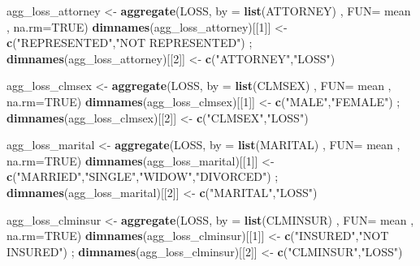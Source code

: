 \documentclass[]{book}
\newenvironment{Shaded}{\begin{snugshade}}{\end{snugshade}}
\newcommand{\DataTypeTok}[1]{\textcolor[rgb]{0.13,0.29,0.53}{#1}}
\newcommand{\DecValTok}[1]{\textcolor[rgb]{0.00,0.00,0.81}{#1}}
\newcommand{\KeywordTok}[1]{\textcolor[rgb]{0.13,0.29,0.53}{\textbf{#1}}}
\newcommand{\NormalTok}[1]{#1}
\newcommand{\OtherTok}[1]{\textcolor[rgb]{0.56,0.35,0.01}{#1}}
\newcommand{\StringTok}[1]{\textcolor[rgb]{0.31,0.60,0.02}{#1}}
\begin{document}
\begin{Shaded}
\begin{Highlighting}[]
\NormalTok{agg_loss_attorney <-}\StringTok{ }\KeywordTok{aggregate}\NormalTok{(LOSS, }\DataTypeTok{by =} \KeywordTok{list}\NormalTok{(ATTORNEY) , }\DataTypeTok{FUN=}\NormalTok{ mean , }\DataTypeTok{na.rm=}\OtherTok{TRUE}\NormalTok{)}
  \KeywordTok{dimnames}\NormalTok{(agg_loss_attorney)[[}\DecValTok{1}\NormalTok{]] <-}\StringTok{ }\KeywordTok{c}\NormalTok{(}\StringTok{"REPRESENTED"}\NormalTok{,}\StringTok{"NOT REPRESENTED"}\NormalTok{) ; }\KeywordTok{dimnames}\NormalTok{(agg_loss_attorney)[[}\DecValTok{2}\NormalTok{]] <-}\StringTok{ }\KeywordTok{c}\NormalTok{(}\StringTok{"ATTORNEY"}\NormalTok{,}\StringTok{"LOSS"}\NormalTok{)}
  
\NormalTok{  agg_loss_clmsex   <-}\StringTok{ }\KeywordTok{aggregate}\NormalTok{(LOSS, }\DataTypeTok{by =} \KeywordTok{list}\NormalTok{(CLMSEX)  , }\DataTypeTok{FUN=}\NormalTok{ mean , }\DataTypeTok{na.rm=}\OtherTok{TRUE}\NormalTok{)}
  \KeywordTok{dimnames}\NormalTok{(agg_loss_clmsex)[[}\DecValTok{1}\NormalTok{]]   <-}\StringTok{ }\KeywordTok{c}\NormalTok{(}\StringTok{"MALE"}\NormalTok{,}\StringTok{"FEMALE"}\NormalTok{)  ; }\KeywordTok{dimnames}\NormalTok{(agg_loss_clmsex)[[}\DecValTok{2}\NormalTok{]] <-}\StringTok{ }\KeywordTok{c}\NormalTok{(}\StringTok{"CLMSEX"}\NormalTok{,}\StringTok{"LOSS"}\NormalTok{)}
  
\NormalTok{  agg_loss_marital  <-}\StringTok{ }\KeywordTok{aggregate}\NormalTok{(LOSS, }\DataTypeTok{by =} \KeywordTok{list}\NormalTok{(MARITAL) , }\DataTypeTok{FUN=}\NormalTok{ mean , }\DataTypeTok{na.rm=}\OtherTok{TRUE}\NormalTok{)}
  \KeywordTok{dimnames}\NormalTok{(agg_loss_marital)[[}\DecValTok{1}\NormalTok{]]  <-}\StringTok{ }\KeywordTok{c}\NormalTok{(}\StringTok{"MARRIED"}\NormalTok{,}\StringTok{"SINGLE"}\NormalTok{,}\StringTok{"WIDOW"}\NormalTok{,}\StringTok{"DIVORCED"}\NormalTok{) ; }\KeywordTok{dimnames}\NormalTok{(agg_loss_marital)[[}\DecValTok{2}\NormalTok{]] <-}\StringTok{ }\KeywordTok{c}\NormalTok{(}\StringTok{"MARITAL"}\NormalTok{,}\StringTok{"LOSS"}\NormalTok{)}
  
\NormalTok{  agg_loss_clminsur <-}\StringTok{ }\KeywordTok{aggregate}\NormalTok{(LOSS, }\DataTypeTok{by =} \KeywordTok{list}\NormalTok{(CLMINSUR) , }\DataTypeTok{FUN=}\NormalTok{ mean , }\DataTypeTok{na.rm=}\OtherTok{TRUE}\NormalTok{)}
  \KeywordTok{dimnames}\NormalTok{(agg_loss_clminsur)[[}\DecValTok{1}\NormalTok{]] <-}\StringTok{ }\KeywordTok{c}\NormalTok{(}\StringTok{"INSURED"}\NormalTok{,}\StringTok{"NOT INSURED"}\NormalTok{) ; }\KeywordTok{dimnames}\NormalTok{(agg_loss_clminsur)[[}\DecValTok{2}\NormalTok{]] <-}\StringTok{ }\KeywordTok{c}\NormalTok{(}\StringTok{"CLMINSUR"}\NormalTok{,}\StringTok{"LOSS"}\NormalTok{)}
  

\end{Highlighting}
\end{Shaded}
\end{document}
